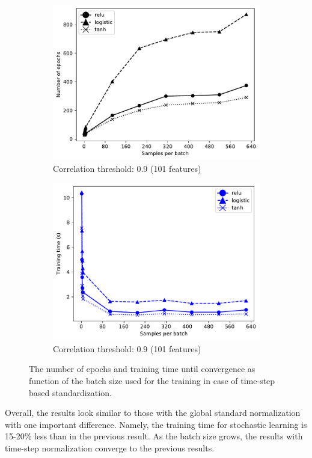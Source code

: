 \documentclass[paper=a4, fontsize=11pt]{scrartcl} %
\begin{document}
\begin{figure}[H]
\begin{subfigure}{0.5\linewidth}
		\includegraphics[width=0.8\linewidth]{../output/neural_network/figures/nn_convergence_time_standard_941_486_feature_pearson_90}
		\caption{Correlation threshold: 0.9 (101 features)}
	\end{subfigure}
	\begin{subfigure}{0.5\linewidth}
		\centering
		\includegraphics[width=0.8\linewidth]{../output/neural_network/figures/nn_convergence_time_standard_941_486_feature_pearson_90_time}
		\caption{Correlation threshold: 0.9 (101 features)}
	\end{subfigure}
	\caption{The number of epochs and training time until convergence as function of the batch size used for the training in case of time-step based standardization.}
	\label{fig:nn_convergence_time_gauss}
\end{figure} 

Overall, the results look similar to those with the global standard normalization with one important difference.
Namely, the training time for stochastic learning is 15-20\% less than in the previous result. 
As the batch size grows, the results with time-step normalization converge to the previous results.
\end{document}
